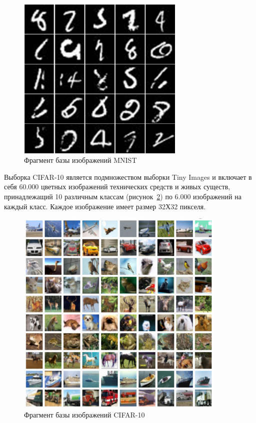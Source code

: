 \begin{figure}[h]
	\begin{center}
		\includegraphics[width=8cm]{man-source/images/ch3/pic3-12.pdf}
		\caption{Фрагмент базы изображений MNIST}		
		\label{fig:mnist_example}
	\end{center}
\end{figure}

Выборка CIFAR-10 \cite[c.~3]{krizhevsky2009learning} является подмножеством выборки Tiny Images \cite[c.~1958]{torralba2008} и включает в себя 60.000 цветных изображений технических средств и живых существ, принадлежащий 10 различным классам (рисунок~\ref{fig:cifar_dataset}) по 6.000 изображений на каждый класс. Каждое изображение имеет размер 32Х32 пикселя.

\begin{figure}[h!]
	\begin{center}
		\includegraphics[width=10cm]{man-source/images/ch3/pic3-2.pdf}
		\caption{Фрагмент базы изображений CIFAR-10}				
		\label{fig:cifar_dataset}
	\end{center}
\end{figure}

